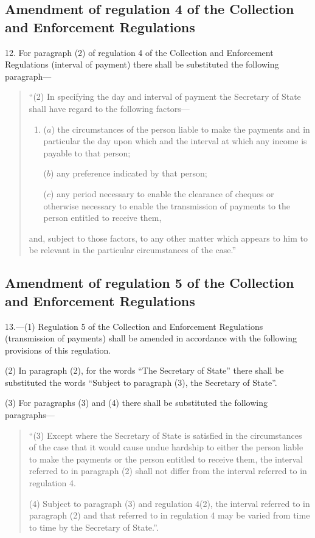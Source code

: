 \documentclass[12pt,a4paper]{article}
\begin{document}
\subsection[12. Amendment of regulation 4 of the Collection and Enforcement Regulations]{Amendment of regulation 4 of the Collection and Enforcement Regulations}

12.  For paragraph (2) of regulation 4 of the Collection and Enforcement Regulations (interval of payment) there shall be substituted the following paragraph—
\begin{quotation}
“(2) In specifying the day and interval of payment the Secretary of State shall have regard to the following factors—
\begin{enumerate}\item[]
($a$) the circumstances of the person liable to make the payments and in particular the day upon which and the interval at which any income is payable to that person;

($b$) any preference indicated by that person;

($c$) any period necessary to enable the clearance of cheques or otherwise necessary to enable the transmission of payments to the person entitled to receive them,
\end{enumerate}
and, subject to those factors, to any other matter which appears to him to be relevant in the particular circumstances of the case.''
\end{quotation}

\subsection[13. Amendment of regulation 5 of the Collection and Enforcement Regulations]{Amendment of regulation 5 of the Collection and Enforcement Regulations}

13.—(1) Regulation 5 of the Collection and Enforcement Regulations (transmission of payments) shall be amended in accordance with the following provisions of this regulation.

(2) In paragraph (2), for the words “The Secretary of State” there shall be substituted the words “Subject to paragraph (3), the Secretary of State”.

(3) For paragraphs (3) and (4) there shall be substituted the following paragraphs—
\begin{quotation}
“(3) Except where the Secretary of State is satisfied in the circumstances of the case that it would cause undue hardship to either the person liable to make the payments or the person entitled to receive them, the interval referred to in paragraph (2) shall not differ from the interval referred to in regulation 4.

(4) Subject to paragraph (3) and regulation 4(2), the interval referred to in paragraph (2) and that referred to in regulation 4 may be varied from time to time by the Secretary of State.”.
\end{quotation}
\end{document}
